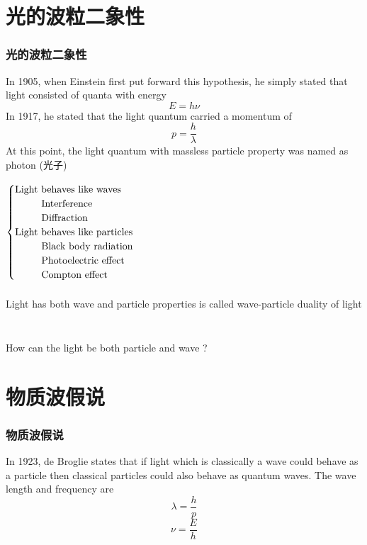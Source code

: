 \section{光的波粒二象性} 

\begin{frame} 
  \frametitle{光的波粒二象性}  
  \bullet In 1905, when Einstein first put forward this hypothesis, 
  he simply stated that light consisted of quanta with energy \[ E = h\nu \] 
  \bullet In 1917, he stated that the light quantum carried a momentum of  \[ p=\frac{h}{\lambda}\]
  At this point, the light quantum with massless particle property was named as photon (光子)
\end{frame}

\begin{frame}  
  $\begin{cases}
    \text{Light behaves like waves }\\
    \text{~~\qquad Interference} \\
    \text{~~\qquad Diffraction} \\
    \text{Light behaves like particles}\\
    \text{~~\qquad Black body radiation} \\
    \text{~~\qquad Photoelectric effect} \\
    \text{~~\qquad Compton effect} \\
   \end{cases}$\\
   ~~\\
   Light has both wave and particle properties is called \alert{wave-particle duality} of light
\end{frame}

\begin{frame}
    \frametitle{}
    \begin{tcolorbox3}[学术讨论]
        ~\\
        How can the light be both particle and wave ?
    \end{tcolorbox3}
\end{frame}

\section{物质波假说}

\begin{frame}   
  \frametitle{物质波假说}
  \begin{tcolorbox4}
  In 1923, de Broglie states that if light which is classically a wave could behave as a particle
  then classical particles could also behave as quantum waves. The wave length and frequency are
  \[\lambda=\frac{h}{p}\]
  \[\nu =\frac{E}{h}\]
  \end{tcolorbox4}
\end{frame}

